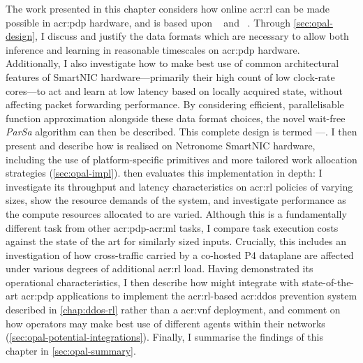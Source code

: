 The work presented in this chapter considers how online \gls{acr:rl} can be made possible in \gls{acr:pdp} hardware, and is based upon ~\parencite{DBLP:conf/conext/SimpsonP21} and ~\parencite{noms-220816}.
Through \cref{sec:opal-design}, I discuss and justify the data formats which are necessary to allow both inference and learning in reasonable timescales on \gls{acr:pdp} hardware.
Additionally, I also investigate how to make best use of common architectural features of SmartNIC hardware---primarily their high count of low clock-rate cores---to act and learn at low latency based on locally acquired state, without affecting packet forwarding performance.
By considering efficient, parallelisable function approximation alongside these data format choices, the novel wait-free \emph{ParSa} algorithm can then be described.
This complete design is termed \approachshort---\approach.
I then present and describe how \approachshort{} is realised on Netronome SmartNIC hardware, including the use of platform-specific primitives and more tailored work allocation strategies (\cref{sec:opal-impl}).
 then evaluates this implementation in depth: I investigate its throughput and latency characteristics on \gls{acr:rl} policies of varying sizes, show the resource demands of the system, and investigate performance as the compute resources allocated to \approachshort{} are varied.
Although this is a fundamentally different task from other \gls{acr:pdp}-\gls{acr:ml} tasks, I compare task execution costs against the state of the art for similarly sized inputs.
Crucially, this includes an investigation of how cross-traffic carried by a co-hosted P4 dataplane are affected under various degrees of additional \gls{acr:rl} load.
Having demonstrated its operational characteristics, I then describe how \approachshort{} might integrate with state-of-the-art \gls{acr:pdp} applications to implement the \gls{acr:rl}-based \gls{acr:ddos} prevention system described in \cref{chap:ddos-rl} rather than a \gls{acr:vnf} deployment, and comment on how operators may make best use of different \approachshort{} agents within their networks (\cref{sec:opal-potential-integrations}).
Finally, I summarise the findings of this chapter in \cref{sec:opal-summary}.

